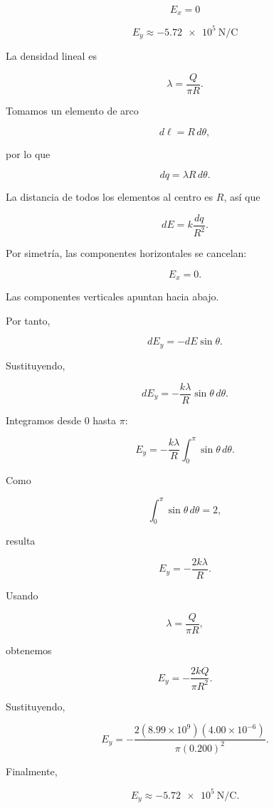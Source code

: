 \begin{respuesta}

\[
\boxed{E_x=0}
\]

\[
\boxed{E_y\approx-\SI{5.72e5}{\newton\per\coulomb}}
\]

\end{respuesta}

\begin{explicacion}

La densidad lineal es

\[
\lambda=\frac{Q}{\pi R}.
\]

Tomamos un elemento de arco

\[
d\ell=R\,d\theta,
\]

por lo que

\[
dq=\lambda R\,d\theta.
\]

La distancia de todos los elementos al centro es \(R\), así que

\[
dE=k\frac{dq}{R^2}.
\]

Por simetría, las componentes horizontales se cancelan:

\[
\boxed{E_x=0}.
\]

Las componentes verticales apuntan hacia abajo.

Por tanto,

\[
dE_y=-dE\sin\theta.
\]

Sustituyendo,

\[
dE_y
=
-\frac{k\lambda}{R}\sin\theta\,d\theta.
\]

Integramos desde \(0\) hasta \(\pi\):

\[
E_y
=
-\frac{k\lambda}{R}
\int_0^\pi\sin\theta\,d\theta.
\]

Como

\[
\int_0^\pi\sin\theta\,d\theta=2,
\]

resulta

\[
E_y=-\frac{2k\lambda}{R}.
\]

Usando

\[
\lambda=\frac{Q}{\pi R},
\]

obtenemos

\[
E_y=-\frac{2kQ}{\pi R^2}.
\]

Sustituyendo,

\[
E_y=
-\frac{2(8.99\times10^9)(4.00\times10^{-6})}
{\pi(0.200)^2}.
\]

Finalmente,

\[
\boxed{E_y\approx-\SI{5.72e5}{\newton\per\coulomb}}.
\]

\end{explicacion}


